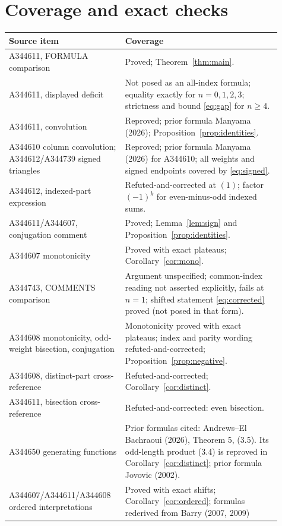 \documentclass[11pt]{article}
\begin{document}
\section{Coverage and exact checks}
\begin{center}\footnotesize
\begin{tabular}{p{0.37\linewidth}p{0.54\linewidth}}
\toprule
Source item & Coverage \\
\midrule
A344611, FORMULA comparison & Proved; Theorem~\ref{thm:main}. \\
A344611, displayed deficit & Not posed as an all-index formula;
equality exactly for $n=0,1,2,3$;
strictness and bound \eqref{eq:gap} for $n\ge4$. \\
A344611, convolution & Reproved; prior formula Manyama (2026);
Proposition~\ref{prop:identities}. \\
A344610 column convolution; A344612/A344739 signed triangles &
Reproved; prior formula Manyama (2026) for A344610;
all weights and signed endpoints covered by \eqref{eq:signed}. \\
A344612, indexed-part expression & Refuted-and-corrected at $(1)$;
factor $(-1)^k$ for even-minus-odd indexed sums. \\
A344611/A344607, conjugation comment & Proved; Lemma~\ref{lem:sign}
and Proposition~\ref{prop:identities}. \\
A344607 monotonicity & Proved with exact plateaus;
Corollary~\ref{cor:mono}. \\
A344743, COMMENTS comparison & Argument unspecified; common-index
reading not asserted explicitly, fails at $n=1$; shifted statement
\eqref{eq:corrected} proved (not posed in that form). \\
A344608 monotonicity, odd-weight bisection, conjugation & Monotonicity
proved with exact plateaus; index and parity wording refuted-and-corrected;
Proposition~\ref{prop:negative}. \\
A344608, distinct-part cross-reference & Refuted-and-corrected;
Corollary~\ref{cor:distinct}. \\
A344611, bisection cross-reference & Refuted-and-corrected: even bisection. \\
A344650 generating functions & Prior formulas cited:
Andrews--El Bachraoui (2026), Theorem 5, (3.5). Its odd-length
product (3.4) is reproved in Corollary~\ref{cor:distinct};
prior formula Jovovic (2002). \\
A344607/A344611/A344608 ordered interpretations & Proved with exact shifts;
Corollary~\ref{cor:ordered}; formulas rederived from Barry (2007, 2009)

\end{tabular}
\end{center}
\end{document}
